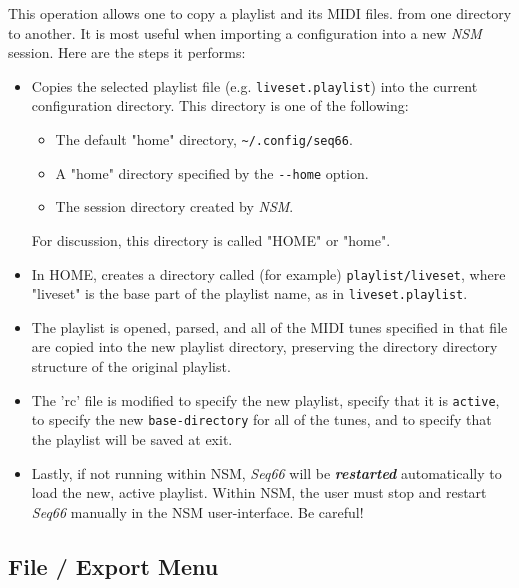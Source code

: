    This operation allows one to copy a playlist and its MIDI files.
   from one directory to another.  It is most useful when
   importing a configuration into a new \textsl{NSM} session.
   Here are the steps it performs:

   \begin{itemize}
      \item Copies the selected playlist file (e.g. \texttt{liveset.playlist})
         into the current configuration directory.
         This directory is one of the following:
         \begin{itemize}
            \item The default "home" directory,
               \texttt{\textasciitilde/.config/seq66}.
            \item A "home" directory specified by the \texttt{-{}-home} option.
            \item The session directory created by \textsl{NSM}.
         \end{itemize}
         For discussion, this directory is called "HOME" or "home".
      \item In HOME, creates a directory called (for example)
         \texttt{playlist/liveset},
         where "liveset" is the base part of the playlist name, as in
         \texttt{liveset.playlist}.
      \item The playlist is opened, parsed, and all of the MIDI tunes specified
         in that file are copied into the new playlist directory, preserving
         the directory directory structure of the original playlist.
      \item The 'rc' file is modified to specify the new playlist,
         specify that it is \texttt{active},
         to specify the new \texttt{base-directory} for all of the tunes,
         and to specify that the playlist will be saved at exit.
      \item Lastly, if not running within NSM, \textsl{Seq66} will be
         \textsl{\textbf{restarted}} automatically to load the new,
         active playlist.
         Within NSM, the user must stop and restart \textsl{Seq66}
         manually in the NSM user-interface.
         Be careful!
   \end{itemize}

\subsection{File / Export Menu}
\label{subsec:midi_export_file_export_menu}

